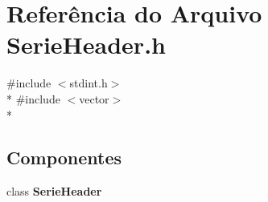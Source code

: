 \section{Referência do Arquivo Serie\+Header.\+h}
\label{_serie_header_8h}
{\ttfamily \#include $<$stdint.\+h$>$}\\*
{\ttfamily \#include $<$vector$>$}\\*
\subsection*{Componentes}
\begin{DoxyCompactItemize}
\item 
class {\bf Serie\+Header}
\end{DoxyCompactItemize}
